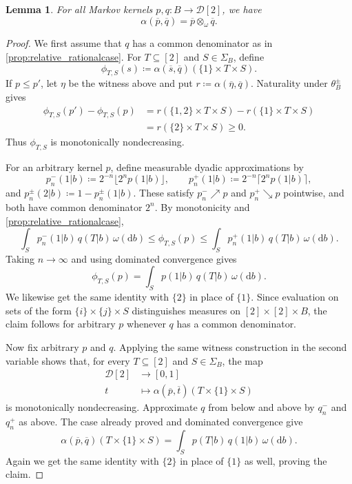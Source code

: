 \documentclass[10pt,a4paper]{amsart}
\newtheorem{lem}{Lemma}
\newcommand{\dist}{\mathcal{D}}
\newcommand{\dx}{\mathrm{d}}
\newcommand{\finiteset}[1]{[#1]}	%
\newcommand{\two}{\finiteset{2}}		%
\begin{document}
\begin{lem}\label{lem:relative_bernoulliirrational}
	For all Markov kernels $p,q : B \to \dist\two$, we have
	\[
		\alpha(\overline{p},\overline{q})
		= \overline{p} \otimes_\omega \overline{q}.
	\]
\end{lem}

\begin{proof}
	We first assume that $q$ has a common denominator as in \cref{prop:relative_rationalcase}.
	For $T \subseteq \two$ and $S \in \Sigma_B$, define
	\[
		\phi_{T,S}(s) \coloneq
		\alpha(\overline{s},\overline{q})(\{1\} \times T \times S).
	\]
	If $p \leq p'$, let $\eta$ be the witness above and put
	$r \coloneq \alpha(\overline{\eta},\overline{q})$.
	Naturality under $\theta_B^\pm$ gives
	\begin{align*}
		\phi_{T,S}(p')-\phi_{T,S}(p)
		&= r(\{1,2\} \times T \times S)-r(\{1\} \times T \times S) \\
		&= r(\{2\} \times T \times S) \geq 0.
	\end{align*}
	Thus $\phi_{T,S}$ is monotonically nondecreasing.

	For an arbitrary kernel $p$, define measurable dyadic approximations by
	\[
		p_n^-(1|b) \coloneq 2^{-n}\lfloor 2^n p(1|b)\rfloor,
		\qquad
		p_n^+(1|b) \coloneq 2^{-n}\lceil 2^n p(1|b)\rceil,
	\]
	and $p_n^\pm(2|b) \coloneq 1-p_n^\pm(1|b)$.
	These satisfy $p_n^- \nearrow p$ and $p_n^+ \searrow p$ pointwise, and both have common denominator $2^n$.
	By monotonicity and \cref{prop:relative_rationalcase},
	\[
		\int_S p_n^-(1|b) \, q(T|b) \, \omega(\dx b)
		\leq \phi_{T,S}(p)
		\leq \int_S p_n^+(1|b) \, q(T|b)\,\omega(\dx b).
	\]
	Taking $n \to \infty$ and using dominated convergence gives
	\[
		\phi_{T,S}(p) = \int_S p(1|b) \, q(T|b) \, \omega(\dx b).
	\]
	We likewise get the same identity with $\{2\}$ in place of $\{1\}$.
	Since evaluation on sets of the form $\{i\} \times \{j\} \times S$ distinguishes measures on $\two \times \two \times B$,
	the claim follows for arbitrary $p$ whenever $q$ has a common denominator.

	Now fix arbitrary $p$ and $q$.
	Applying the same witness construction in the second variable shows that, for every $T \subseteq \two$ and $S \in \Sigma_B$, the map
	\begin{align*}
		\dist\two & \longrightarrow [0,1] \\
		t & \longmapsto \alpha(\overline{p},\overline{t})(T \times \{1\} \times S)
	\end{align*}
	is monotonically nondecreasing.
	Approximate $q$ from below and above by $q_n^-$ and $q_n^+$ as above.
	The case already proved and dominated convergence give
	\[
		\alpha(\overline{p},\overline{q})(T \times \{1\} \times S)
		= \int_S p(T|b) \, q(1|b) \, \omega(\dx b).
	\]
	Again we get the same identity with $\{2\}$ in place of $\{1\}$ as well, proving the claim.
\end{proof}
\end{document}
